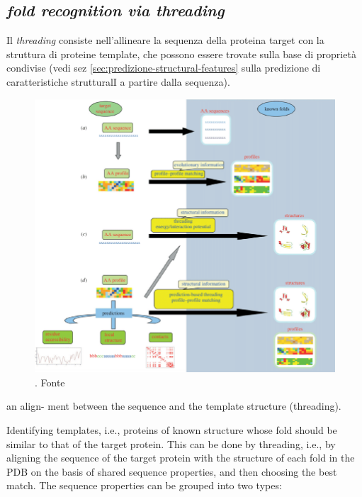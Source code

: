\subsection{\textit{fold recognition via threading}}
{

Il \textit{threading} consiste nell'allineare la sequenza della proteina target con la struttura di proteine template, che possono essere trovate sulla base di proprietà condivise (vedi sez \ref{sec:predizione-structural-features} sulla predizione di caratteristiche strutturalI a partire dalla sequenza).

\begin{figure}[!htb]
	\centering
	\includegraphics[scale=0.53]{images/threading-mappa.png}
	\caption{. Fonte\cite{joseph2014local}}
	\label{fig:fold-recognition}
\end{figure}

an align-
ment between the sequence and the template structure
(threading).

Identifying templates, i.e., proteins of known structure whose fold should be similar to
that of the target protein. This can be done by threading, i.e., by aligning the sequence
of the target protein with the structure of each fold in the PDB on the basis of shared
sequence properties, and then choosing the best match. The sequence properties can
be grouped into two types:

}
